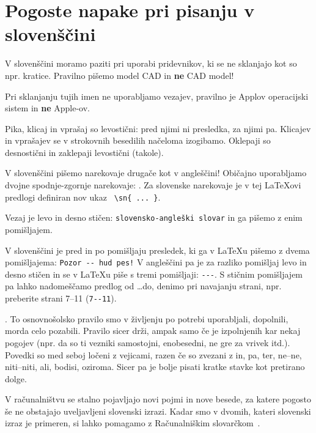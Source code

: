 \documentclass[a4paper, 12pt]{book}
\begin{document}
\chapter{Pogoste napake pri pisanju v slovenščini}  %
\label{slo}

V slovenščini moramo paziti  pri uporabi pridevnikov, ki se ne sklanjajo kot so npr. kratice. 
Pravilno pišemo model CAD in \textbf{ne} CAD model!

Pri sklanjanju tujih imen ne uporabljamo vezajev, pravilno je Applov operacijski sistem in \textbf{ne} Apple-ov.

Pika, klicaj in vprašaj so levostični: pred njimi ni presledka, za njimi pa. 
Klicajev in vprašajev se v strokovnih besedilih načeloma izogibamo. Oklepaji so desnostični in zaklepaji levostični (takole).

V slovenščini pišemo narekovaje drugače kot v angleščini!   
Običajno uporabljamo dvojne spodnje-zgornje narekovaje:  .
Za slovenske narekovaje je v tej LaTeXovi predlogi definiran nov ukaz \verb+ \sn{ ... }+.

Vezaj  je levo in desno stičen: \verb=slovensko-angleški slovar= in ga pišemo z enim pomišljajem.

V slovenščini je pred in po pomišljaju presledek, ki ga v LaTeXu pišemo z dvema pomišljajema: \verb=Pozor -- hud pes!=
V angleščini pa je za razliko pomišljaj levo in desno stičen in se v LaTeXu piše s tremi  pomišljaji: \verb=---=.
S stičnim pomišljajem pa lahko nadomeščamo predlog od \dots do, denimo pri navajanju strani, npr. preberite strani 7--11 (\verb=7--11=).



. To osnovnošolsko pravilo smo v življenju po potrebi uporabljali, dopolnili, morda celo pozabili. 
Pravilo sicer drži, ampak samo če je izpolnjenih kar nekaj pogojev (npr. da so ti vezniki samostojni, enobesedni, ne gre za vrivek itd.).
Povedki so med seboj ločeni z vejicami, razen če so zvezani z in, pa, ter, ne–ne, niti–niti, ali, bodisi, oziroma.
Sicer pa je bolje pisati kratke stavke kot pretirano dolge.

V računalništvu se stalno pojavljajo novi pojmi in nove besede, za katere pogosto še ne obstajajo uveljavljeni slovenski izrazi.
Kadar smo v dvomih, kateri slovenski izraz je primeren, si lahko pomagamo z Računalniškim slovarčkom~\cite{slovarcek}.
\end{document}
